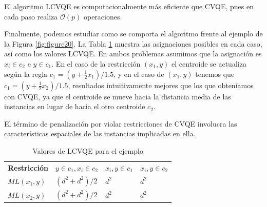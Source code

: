 \begin{observacion}
	
	El algoritmo \acs{LCVQE} es computacionalmente más eficiente que \acs{CVQE}, pues en cada paso realiza $\mathcal{O}(p)$ operaciones.
	
\end{observacion}

Finalmente, podemos estudiar como se comporta el algoritmo frente al ejemplo de la Figura \ref{fig:figure20}. La Tabla \ref{tab:tabla4} muestra las asignaciones posibles en cada caso, así como los valores \acs{LCVQE}. En ambos problemas asumimos que la asignación es $x_i \in c_2$ e $y \in c_1$. En el caso de la restricción $(x_1, y)$ el centroide se actualiza según la regla $c_1 = (y + \frac{1}{2}x_1)/1.5$, y en el caso de $(x_1, y)$ tenemos que $c_1 = (y + \frac{1}{2}x_2)/1.5$, resultados intuitivamente mejores que los que obteníamos con \acs{CVQE}, ya que el centroide se mueve hacia la distancia media de las instancias en lugar de hacia el otro centroide $c_2$.

\begin{observacion}
	
	El término de penalización por violar restricciones de \acs{CVQE} involucra las características espaciales de las instancias implicadas en ella.
	
\end{observacion}

\begin{table}[!h]
	\centering
	\setlength{\arrayrulewidth}{1mm}
	\setlength{\tabcolsep}{10pt}
	\renewcommand{\arraystretch}{1}
	
	\begin{tabular}{ >{\centering\arraybackslash}m{2cm}  >{\centering\arraybackslash}m{2.5cm}>{\centering\arraybackslash}m{2cm}>{\centering\arraybackslash}m{2cm}}
		\hline
		\rowcolor{black}
		\multicolumn{4}{c}{\bf \color{white}{Valores de LCVQE}}\\
		\hline
		\rowcolor{gray!50}
		\textbf{Restricción} & \textbf{$y \in c_1, x_i \in c_2$} & \textbf{$x_i,y \in c_1$} & \textbf{$x_i,y \in c_2$}  \\
		$ML(x_1, y)$ & $(d^2 + d^2)/2$ & $d^2$ & $d^2$  \\
		$ML(x_2, y)$  & $(d^2 + d^2)/2$ & $d^2$ & $d^2$ \\
		\hline
		
	\end{tabular}
	\caption[Valores de LCVQE para el ejemplo]{Valores de LCVQE para el ejemplo \cite{CECM:2012}}
	\label{tab:tabla4}
\end{table}

